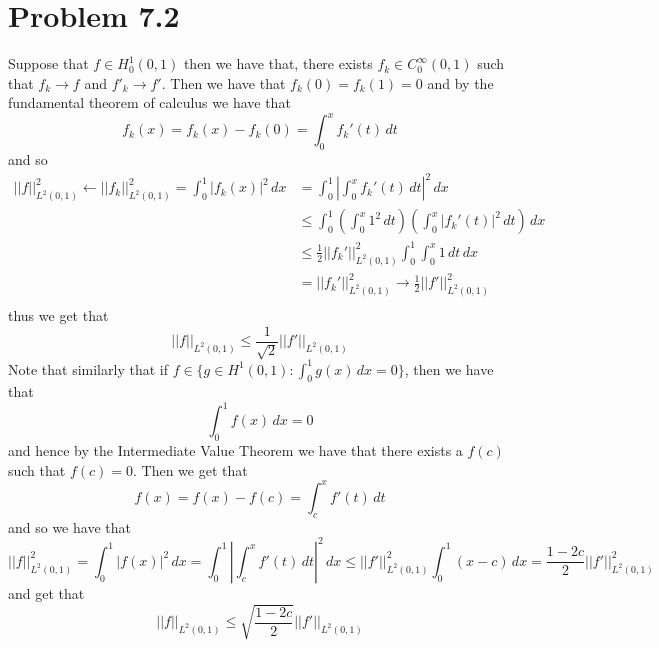 \documentclass[12pt]{report}
\newcommand{\norm}[1]{\left|\left|#1\right|\right|}
\begin{document}
\maketitle
\section*{Problem 7.2}
Suppose that $f \in H_0^1(0,1)$ then we have that, there exists $f_k \in C_0^\infty(0,1)$ such that $f_k \to f$ and $f'_k \to f'$. Then we have that $f_k(0) = f_k(1) = 0$ and
by the fundamental theorem of calculus we have that
\begin{equation*}
  f_k(x) = f_k(x) - f_k(0) = \int_0^x f_k'(t) \, dt
\end{equation*} 
and so
\begin{align*}
  \norm{f}^2_{L^2(0,1)} \leftarrow \norm{f_k}^2_{L^2(0,1)} = \int_0^1 |f_k(x)|^2 \, dx &= \int_0^1 \left| \int_0^x f_k'(t) \, dt \right|^2 \, dx \\
                                                                                       &\leq \int_0^1\left(\int_0^x 1^2 \, dt\right)  \left(\int_0^x |f_k'(t)|^2 \, dt \right) \, dx \\
                                                                                       &\leq \frac{1}{2}\norm{f_k'}^2_{L^2(0,1)} \int_0^1 \int_0^x 1\, dt \, dx \\ 
                                                                                       &= \norm{f_k'}^2_{L^2(0,1)} \to \frac{1}{2} \norm{f'}^2_{L^2(0,1)}  \\
\end{align*}
thus we get that
\begin{equation*}
  \norm{f}_{L^2(0,1)} \leq \frac{1}{\sqrt{2}} \norm{f'}_{L^2(0,1)}
\end{equation*}
Note that similarly that if $f \in \{g \in H^1(0,1) : \int_0^1 g(x)\,dx = 0\}$, then we have that
\begin{equation*}
  \int_0^1f(x) \, dx = 0
\end{equation*}
and hence by the Intermediate Value Theorem we have that there exists a $f(c)$ such that $f(c) = 0$. Then we get that
\begin{equation*}
  f(x) = f(x) - f(c) = \int_c^x f'(t) \, dt
\end{equation*}
and so we have that
\begin{equation*}
  \norm{f}^2_{L^2(0,1)} = \int_0^1 |f(x)|^2 \, dx = \int_0^1 \left| \int_c^x f'(t) \, dt \right|^2 \, dx \leq \norm{f'}^2_{L^2(0,1)}\int_0^1 (x-c) \, dx = \frac{1 - 2c}{2} \norm{f'}^2_{L^2(0,1)}
\end{equation*}
and get that
\begin{equation*}
  \norm{f}_{L^2(0,1)} \leq \sqrt{\frac{1-2c}{2}} \norm{f'}_{L^2(0,1)}
\end{equation*}
\end{document}
